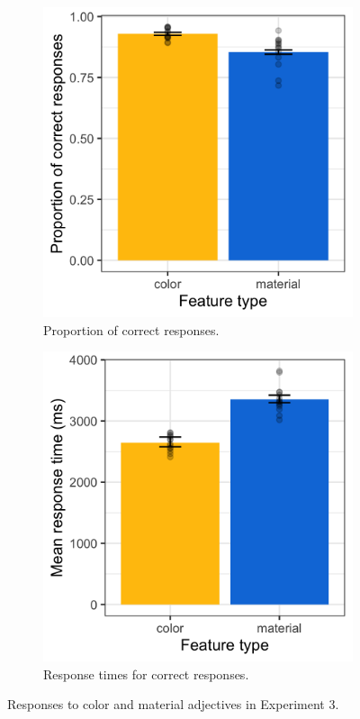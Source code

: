 \documentclass[12pt,letterpaper]{article}
\begin{document}
\begin{figure}[ht]
   \centering
   \begin{subfigure}{.4\textwidth}
   \centering
   \includegraphics[width=\textwidth]{plots/exp3_proportion.png}
   \caption{Proportion of correct responses.}
   \label{fig:exp3_a}
   \end{subfigure} \hspace{9mm}
   \begin{subfigure}{.4 \textwidth}
   \centering
   \includegraphics[width=\textwidth]{plots/exp3_rt.png}
   \caption{Response times for correct responses.}
   \label{fig:exp3_b}
   \end{subfigure}
   \caption{Responses to color and material adjectives in Experiment 3.}
   \label{fig:exp3}
\end{figure}   
\end{document}
